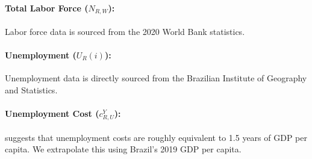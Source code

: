 \documentclass[msom,blindrev]{informs3} %
\begin{document}
\begin{APPENDICES}
\paragraph{Total Labor Force ($N_{R,W}$):} Labor force data is sourced from the 2020 World Bank statistics.

\paragraph{Unemployment ($U_R(i)$):} Unemployment data is directly sourced from the Brazilian Institute of Geography and Statistics.

\paragraph{Unemployment Cost ($c^Y_{R,U}$):}  suggests that unemployment costs are roughly equivalent to 1.5 years of GDP per capita. We extrapolate this using Brazil's 2019 GDP per capita.

\end{APPENDICES}
\end{document}
